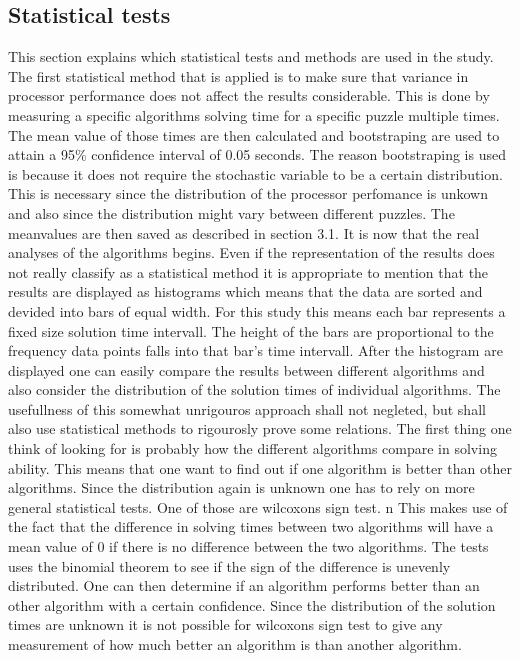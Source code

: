 \documentclass[a4paper,11pt]{kth-mag}
\begin{document}
\subsection{Statistical tests}
This section explains which statistical tests and methods are used in the study.
The first statistical method that is applied is to make sure that variance in processor performance does not affect the results considerable. 
This is done by measuring a specific algorithms solving time for a specific puzzle multiple times. 
The mean value of those times are then calculated and bootstraping are used to attain a 95\% confidence interval of 0.05 seconds. 
The reason bootstraping is used is because it does not require the stochastic variable to be a certain distribution. 
This is necessary since the distribution of the processor perfomance is unkown and also since the distribution might vary between different puzzles. 
\newline
The meanvalues are then saved as described in section 3.1.
It is now that the real analyses of the algorithms begins. 
Even if the representation of the results does not really classify as a statistical method it is appropriate to mention that the results are displayed as histograms which means that the data are sorted and devided into bars of equal width. 
For this study this means each bar represents a fixed size solution time intervall. 
The height of the bars are proportional to the frequency data points falls into that bar's time intervall.
After the histogram are displayed one can easily compare the results between different algorithms and also consider the distribution of the solution times of individual algorithms. The usefullness of this somewhat unrigouros approach shall not negleted, but shall also use statistical methods to rigourosly prove some relations.
\newline
The first thing one think of looking for is probably how the different algorithms compare in solving ability. 
This means that one want to find out if one algorithm is better than other algorithms. 
Since the distribution again is unknown one has to rely on more general statistical tests. 
One of those are wilcoxons sign test. n
This makes use of the fact that the difference in solving times between two algorithms will have a mean value of 0 if there is no difference between the two algorithms. 
The tests uses the binomial theorem to see if the sign of the difference is unevenly distributed.
One can then determine if an algorithm performs better than an other algorithm with a certain confidence.
Since the distribution of the solution times are unknown it is not possible for wilcoxons sign test to give any measurement of how much better an algorithm is than another algorithm.
\end{document}
